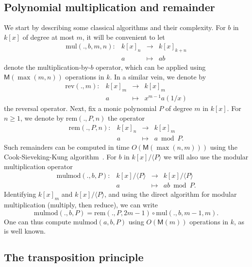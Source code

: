 \documentclass{sig-alternate}
\def\M {\ensuremath{\mathsf{M}}}
\def\mul {\ensuremath{\mathrm{mul}}}
\def\rem {\ensuremath{\mathrm{rem}}}
\def\mulmod {\ensuremath{\mathrm{mulmod}}}
\def\rev {\ensuremath{\mathrm{rev}}}
\newcommand{\ang}[1]{\langle#1\rangle}
\begin{document}

\subsection{Polynomial multiplication and remainder}

We start by describing some classical algorithms and their complexity.
For $b$ in $k[x]$ of degree at most $m$, it will be convenient to let
$$
\begin{array}{cccc}
\mul(.,b,m,n): &k[x]_n& \to &k[x]_{k+n}\\
& a & \mapsto & ab
\end{array}$$ 
denote the multiplication-by-$b$ operator, which can be applied using
$\M(\max(m,n))$ operations in $k$. In a similar vein, we denote by
$$
\begin{array}{cccc}
\rev(.,m): &k[x]_m &\to& k[x]_m  \\
& a & \mapsto & x^{m-1} a(1/x)
\end{array}$$ the reversal operator. 
Next, fix a monic polynomial $P$ of degree $m$ in $k[x]$. For $n \ge 1$, we denote by
$\rem(.,P,n)$ the operator
$$
\begin{array}{cccc}
\rem(.,P,n): &k[x]_n& \to &k[x]_{m}\\
& a & \mapsto & a \bmod P.
\end{array}$$ 
Such remainders can be computed in time $O(\M(\max(n,m)))$ using the
Cook-Sieveking-Kung algorithm~\cite[Chapter~9]{vzGG}. For $b$
in $k[x]/\ang{P}$ we will also use the modular multiplication
operator
$$\begin{array}{cccc} \mulmod(.,b,P): & k[x]/\ang{P} & \to
  & k[x]/\ang{P}\\ & a & \mapsto & ab \bmod P.
\end{array}$$ 
Identifying $k[x]_m$ and $k[x]/\ang{P}$, and using the
direct algorithm for modular multiplication (multiply, then reduce),
we can write 
\begin{equation}
  \label{eq:mulmod}
  \mulmod(.,b,P) = \rem(.,P,2m-1) \circ \mul(.,b,m-1,m).
\end{equation}
One can thus compute $\mulmod(a,b,P)$ using $O(\M(m))$ operations in
$k$, as is well known.


\subsection{The transposition principle}
\label{sec:algor-dual-basis}
\end{document}
